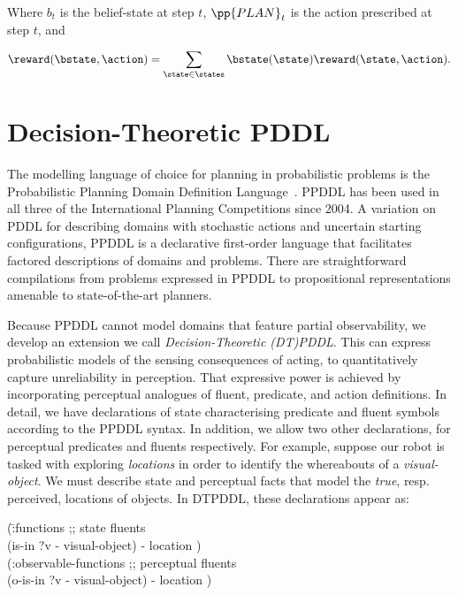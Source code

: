 \documentclass{article}
\begin{document}
\noindent Where $b_t$ is the belief-state at step $t$, $\pp{PLAN}_t$ is
the action prescribed at step $t$, and

\[\reward(\bstate, \action) = \sum_{\state \in \states}
\bstate(\state)\reward(\state, \action).\] 





\section{Decision-Theoretic PDDL}


The modelling language of choice for planning in probabilistic
problems is the Probabilistic Planning Domain Definition
Language~\cite{younes:littman:04,younes:etal:2005}. PPDDL has been
used in all three of the International Planning Competitions since
2004. A variation on PDDL for describing domains with stochastic
actions and uncertain starting configurations, PPDDL is a declarative
first-order language that facilitates factored descriptions of domains
and problems. There are straightforward compilations from problems
expressed in PPDDL to propositional representations amenable
to state-of-the-art planners.

Because PPDDL cannot model domains that feature partial observability,
we develop an extension we call {\em Decision-Theoretic
(DT)PDDL}. This can express probabilistic models of the sensing
consequences of acting, to quantitatively capture unreliability in
perception. That expressive power is achieved by incorporating
perceptual analogues of fluent, predicate, and action definitions. In
detail, we have declarations of state characterising predicate and
fluent symbols according to the PPDDL syntax. In addition, we allow
two other declarations, for perceptual predicates and fluents
respectively. For example, suppose our robot is tasked with exploring
{\em locations} in order to identify the whereabouts of a {\em
visual-object}. We must describe state and perceptual facts that model
the {\em true}, resp. perceived, locations of objects. In DTPDDL,
these declarations appear as:

\small
\begin{tabtt}
(\=:functions  ;; state fluents\\
  \> (is-in ?v - visual-object) - location )\\
(:observable-functions  ;; perceptual fluents\\
  \> (o-is-in ?v - visual-object) - location )
\end{tabtt}
\normalsize
\end{document}
